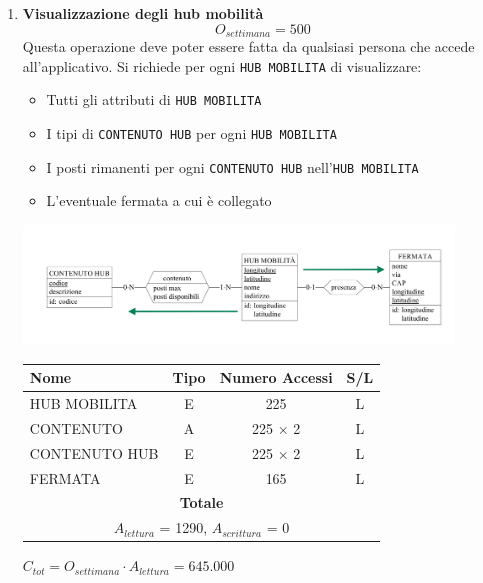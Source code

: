 \documentclass[12pt,a4paper]{report}
\begin{document}
\begin{enumerate}[label=\textbf{\arabic*)}]
        \item \textbf{Visualizzazione degli hub mobilità} \label{op3} \\
	\[{O_{settimana} = 500}\]
	Questa operazione deve poter essere fatta da qualsiasi persona che accede all'applicativo. Si richiede per ogni \texttt{HUB MOBILITA} di visualizzare:
	\begin{itemize}
	\renewcommand\labelitemi{--}
	    \item Tutti gli attributi di \texttt{HUB MOBILITA}
	    \item I tipi di \texttt{CONTENUTO HUB} per ogni \texttt{HUB MOBILITA}
	    \item I posti rimanenti per ogni \texttt{CONTENUTO HUB} nell'\texttt{HUB MOBILITA}
	    \item L'eventuale fermata a cui è collegato
	\end{itemize}
	\begin{center}
	\includegraphics[width=0.9\textwidth]{VisualHubMobilita}
	\end{center}
    \begin{table}[H]
    \centering
	\begin{tabular}{|l|c|c|c|}
	\hline
	Nome & Tipo & Numero Accessi & S/L \\
	\hline
	HUB MOBILITA & E & 225 & L \\
	\hline
	CONTENUTO & A & 225 $\times$ 2 & L \\
	\hline
	CONTENUTO HUB & E & 225 $\times$ 2 & L \\
	\hline
	FERMATA & E & 165 & L \\
	\hline
        \multicolumn{4}{c}{\textbf{Totale}} \\
        \multicolumn{4}{c}{${A_{lettura}}$ = 1290, ${A_{scrittura}}$ = 0} \\
        \hline
	\end{tabular}
    \end{table}
    \begin{center}
    ${C_{tot} = {O_{settimana}}\cdot{A_{lettura}}= 645.000}$
    \end{center}



\end{enumerate}
\end{document}
